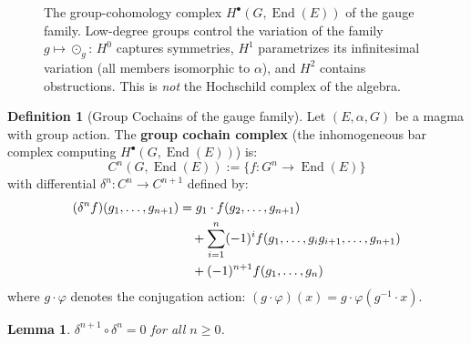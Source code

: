 \documentclass[11pt,a4paper,openany]{book}
\theoremstyle{plain}
\newtheorem{lemma}[theorem]{Lemma}
\theoremstyle{definition}
\newtheorem{definition}[theorem]{Definition}
\newcommand{\twing}[1]{\odot_{#1}}
\newcommand{\lingroup}{L}
\newcommand{\actspace}{E}
\newcommand{\groupG}{G}
\DeclareMathOperator{\End}{End}
\begin{document}
\begin{figure}[ht]
\caption{The group-cohomology complex $H^\bullet(\groupG,\End(\actspace))$ of the gauge family. Low-degree
groups control the variation of the family $g\mapsto\twing{g}$: $H^0$ captures symmetries,
$H^1$ parametrizes its infinitesimal variation (all members isomorphic to $\alpha$), and $H^2$ contains obstructions. This is \emph{not} the Hochschild complex of the algebra.}
\label{fig:hochschild-complex}
\end{figure}

\begin{definition}[Group Cochains of the gauge family]\label{def:hochschild-cochains}
Let $(\actspace, \alpha, \groupG)$ be a magma with group action. The \textbf{group cochain complex} (the inhomogeneous bar complex computing $H^\bullet(\groupG,\End(\actspace))$) is:
\[
C^n(\groupG, \End(\actspace)) := \{f : \groupG^n \to \End(\actspace)\}
\]
with differential $\delta^n : C^n \to C^{n+1}$ defined by:
\begin{align}\label{eq:hochschild-diff}
(\delta^n f)(g_1, \ldots, g_{n+1}) &= g_1 \cdot f(g_2, \ldots, g_{n+1}) \\
&\quad + \sum_{i=1}^{n} (-1)^i f(g_1, \ldots, g_ig_{i+1}, \ldots, g_{n+1}) \notag\\
&\quad + (-1)^{n+1} f(g_1, \ldots, g_n) \notag
\end{align}
where $g \cdot \varphi$ denotes the conjugation action: $(g \cdot \varphi)(x) = g \cdot \varphi(g^{-1} \cdot x)$.
\end{definition}

\begin{lemma}\label{lem:d-squared-zero}
$\delta^{n+1} \circ \delta^n = 0$ for all $n \geq 0$.
\end{lemma}
\end{document}
